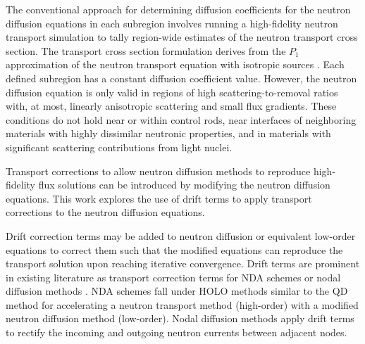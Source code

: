 The conventional approach for determining diffusion coefficients for the neutron diffusion
equations in each subregion involves
running a high-fidelity neutron transport simulation to tally region-wide estimates of the neutron
transport cross section. The transport cross section formulation derives from the $P_1$
approximation of the neutron transport equation with isotropic sources \cite{bellNuclearReactorTheory1970a}.
Each defined subregion has a constant diffusion coefficient value. However, the neutron diffusion
equation is only valid in regions of high scattering-to-removal ratios with, at most, linearly
anisotropic scattering and small flux gradients. These conditions do not hold near or within
control rods, near interfaces of neighboring materials with highly dissimilar neutronic properties,
and in materials with significant scattering contributions from light nuclei.

Transport corrections to allow neutron diffusion methods to reproduce high-fidelity flux solutions
can be introduced by modifying the neutron diffusion equations. This work explores the use of
drift terms to apply transport corrections to the neutron diffusion
equations.

Drift correction terms may be added to neutron diffusion or equivalent low-order equations to
correct them such that the modified equations can reproduce the transport solution upon reaching
iterative convergence. Drift terms are prominent in existing literature as transport correction
terms for \gls{NDA} schemes \cite{adams_fast_2002, wangDiffusionAccelerationSchemes2014,
sun_discrete-ordinates_2024} or nodal diffusion methods
\cite{smith_nodal_1983, smith_assembly_1986}. \gls{NDA} schemes fall under \gls{HOLO} methods
\cite{chacon_multiscale_2017} similar to the \gls{QD} method
for accelerating a neutron transport
method (high-order) with a modified neutron diffusion method (low-order). Nodal
diffusion methods apply drift terms to rectify the incoming and outgoing neutron
currents between adjacent nodes.

